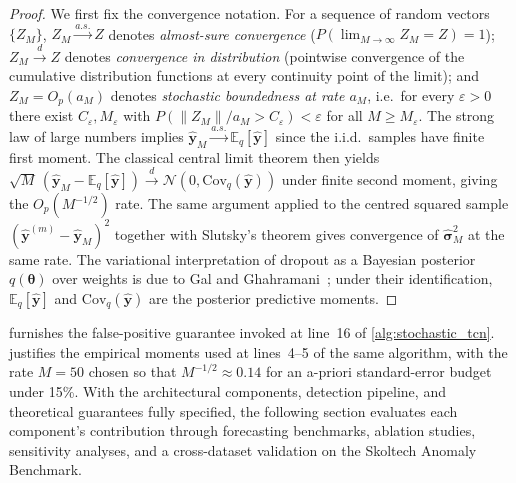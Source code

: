 \begin{proof}
We first fix the convergence notation. For a sequence of random vectors $\{Z_M\}$, $Z_M \xrightarrow{a.s.} Z$ denotes \emph{almost-sure convergence} ($P(\lim_{M\to\infty} Z_M = Z)=1$); $Z_M \xrightarrow{d} Z$ denotes \emph{convergence in distribution} (pointwise convergence of the cumulative distribution functions at every continuity point of the limit); and $Z_M = O_p(a_M)$ denotes \emph{stochastic boundedness at rate $a_M$}, i.e.\ for every $\varepsilon>0$ there exist $C_\varepsilon,M_\varepsilon$ with $P(\|Z_M\|/a_M > C_\varepsilon) < \varepsilon$ for all $M \geq M_\varepsilon$. The strong law of large numbers implies $\hat{\mathbf{y}}_M \xrightarrow{a.s.} \mathbb{E}_q[\hat{\mathbf{y}}]$ since the i.i.d.\ samples have finite first moment. The classical central limit theorem then yields $\sqrt{M}\,(\hat{\mathbf{y}}_M - \mathbb{E}_q[\hat{\mathbf{y}}]) \xrightarrow{d} \mathcal{N}(0, \mathrm{Cov}_q(\hat{\mathbf{y}}))$ under finite second moment, giving the $O_p(M^{-1/2})$ rate. The same argument applied to the centred squared sample $(\hat{\mathbf{y}}^{(m)} - \hat{\mathbf{y}}_M)^{2}$ together with Slutsky's theorem gives convergence of $\widehat{\boldsymbol{\sigma}}^{2}_M$ at the same rate. The variational interpretation of dropout as a Bayesian posterior $q(\boldsymbol{\theta})$ over weights is due to Gal and Ghahramani~\cite{gal2016dropout_bayesian}; under their identification, $\mathbb{E}_{q}[\hat{\mathbf{y}}]$ and $\mathrm{Cov}_{q}(\hat{\mathbf{y}})$ are the posterior predictive moments.
\end{proof} 

 furnishes the false-positive guarantee invoked at line~16 of \cref{alg:stochastic_tcn}.  justifies the empirical moments used at lines~4--5 of the same algorithm, with the rate $M=50$ chosen so that $M^{-1/2}\approx 0.14$ for an a-priori standard-error budget under 15\%. With the architectural components, detection pipeline, and theoretical guarantees fully specified, the following section evaluates each component's contribution through forecasting benchmarks, ablation studies, sensitivity analyses, and a cross-dataset validation on the Skoltech Anomaly Benchmark.

